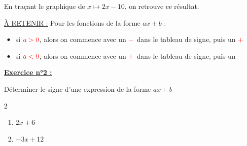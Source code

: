 \documentclass[12pt]{article}
\begin{document}
\vspace{5pt}

En traçant le graphique de $x \longmapsto 2x - 10$, on retrouve ce 
résultat.

\begin{mdframed}[
    linewidth=1pt,
    roundcorner=5pt,
    linecolor=red
]
    {\color{red}\underline{À RETENIR :}}
    Pour les fonctions de la forme $ax+b$ :
    \begin{itemize}
        \item si $\color{red}a>0$, alors on commence avec un $\color{red}-$ dans le 
        tableau de signe, 
        puis un $\color{red}+$
        \item si $\color{red}a<0$, alors on commence avec un $\color{red}+$ dans le 
        tableau de signe, puis un $\color{red}-$
    \end{itemize}
\end{mdframed}

\begin{center}
\end{center}


\vspace{10pt}


\begin{mdframed}[
    linewidth=1pt,
    linecolor=RoyalBlue,
    innertopmargin=10pt,
    innerbottommargin=10pt
]
{\color{RoyalBlue}\textbf{\underline{Exercice n°2 :}}}
\vspace{5pt}

Déterminer le signe d'une expression de la forme $ax+b$
\vspace{-10pt}
\begin{multicols}{2}
    \begin{enumerate}
        \item $2x + 6$
        \item $-3x + 12$
    \end{enumerate}
\end{multicols}

\end{mdframed}
\end{document}
